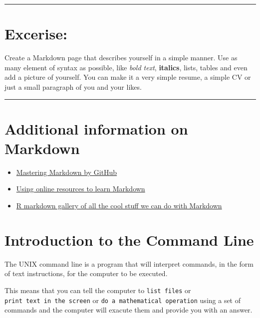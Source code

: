 \documentclass[
]{book}
\providecommand{\tightlist}{%
  \setlength{\itemsep}{0pt}\setlength{\parskip}{0pt}}
\begin{document}
\begin{center}\rule{0.5\linewidth}{0.5pt}\end{center}

\hypertarget{excerise}{%
\chapter{Excerise:}\label{excerise}}

Create a Markdown page that describes yourself in a simple manner. Use as many element of syntax as possible, like \emph{bold text}, \textbf{italics}, lists, tables and even add a picture of yourself. You can make it a very simple resume, a simple CV or just a small paragraph of you and your likes.

\begin{center}\rule{0.5\linewidth}{0.5pt}\end{center}

\hypertarget{additional-information-on-markdown}{%
\chapter{Additional information on Markdown}\label{additional-information-on-markdown}}

\begin{itemize}
\tightlist
\item
  \href{https://guides.github.com/features/mastering-markdown/}{Mastering Markdown by GitHub}
\item
  \href{https://www.markdowntutorial.com/}{Using online resources to learn Markdown}
\item
  \href{https://rmarkdown.rstudio.com/gallery.html}{R markdown gallery of all the cool stuff we can do with Markdown}
\end{itemize}

\hypertarget{introduction-to-the-command-line}{%
\chapter{Introduction to the Command Line}\label{introduction-to-the-command-line}}

The UNIX command line is a program that will interpret commands, in the form of text instructions, for the computer to be executed.

This means that you can tell the computer to \texttt{list\ files} or \texttt{print\ text\ in\ the\ screen} or \texttt{do\ a\ mathematical\ operation} using a set of commands and the computer will exacute them and provide you with an answer.
\end{document}
